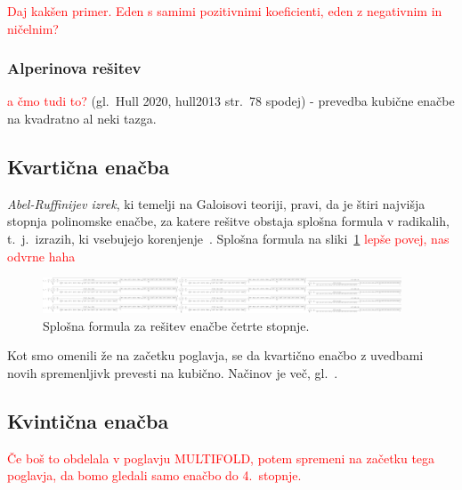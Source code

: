 \textcolor{red}{Daj kakšen primer. Eden s samimi pozitivnimi koeficienti, eden z negativnim in ničelnim?}

\subsubsection{Alperinova rešitev}

\textcolor{red}{a čmo tudi to?} (gl.\ Hull 2020, hull2013 str.\ 78 spodej) - prevedba kubične enačbe na kvadratno al neki tazga.

\subsection{Kvartična enačba}

\emph{Abel-Ruffinijev izrek}, ki temelji na Galoisovi teoriji, pravi, da je štiri najvišja stopnja polinomske enačbe, za katere rešitve obstaja splošna formula v radikalih, t.\ j.\ izrazih, ki vsebujejo korenjenje~\cite{mrinal2019}. Splošna formula na sliki~\ref{fig:kvarticna_formula} \textcolor{red}{lepše povej, nas odvrne haha}

\begin{figure}[h]
    \centering
    \includegraphics[width=0.95\textwidth]{images/quartic_formula.png}
    \caption[Kvartična formula]{Splošna formula za rešitev enačbe četrte stopnje.}
    \label{fig:kvarticna_formula}
\end{figure}

Kot smo omenili že na začetku poglavja, se da kvartično enačbo z uvedbami novih spremenljivk prevesti na kubično. Načinov je več, gl.\ \cite{wikiquartic}.


\subsection{Kvintična enačba}

\textcolor{red}{Če boš to obdelala v poglavju MULTIFOLD, potem spremeni na začetku tega poglavja, da bomo gledali samo enačbo do 4.\ stopnje.}